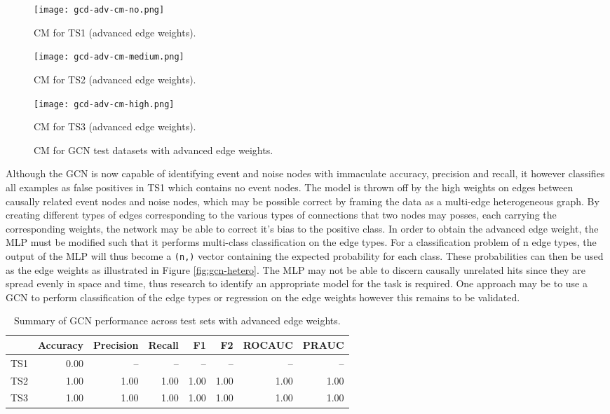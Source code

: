 \begin{figure}[htb]
  \centering
    \begin{minipage}{0.32\textwidth}
    \centering
    \texttt{[image: gcd-adv-cm-no.png]}
    \caption{CM for TS1 (advanced edge weights).}
  \end{minipage}
  \begin{minipage}{0.32\textwidth}
    \centering
    \texttt{[image: gcd-adv-cm-medium.png]}
    \caption{CM for TS2 (advanced edge weights).}
  \end{minipage}
  \begin{minipage}{0.32\textwidth}
    \centering
    \texttt{[image: gcd-adv-cm-high.png]}
    \caption{CM for TS3 (advanced edge weights).}
  \end{minipage}
  \caption{CM for GCN test datasets with advanced edge weights.}
  \label{fig:gcn-cm-adv}
\end{figure}

Although the GCN is now capable of identifying event and noise nodes
with immaculate accuracy, precision and recall, it however classifies
all examples as false positives in TS1 which contains no event nodes.
The model is thrown off by the high weights on edges between causally
related event nodes and noise nodes, which may be possible correct by
framing the data as a multi-edge heterogeneous graph. By creating
different types of edges corresponding to the various types of
connections that two nodes may posses, each carrying the corresponding
weights, the network may be able to correct it's bias to the positive
class. In order to obtain the advanced edge weight, the MLP must be
modified such that it performs multi-class classification on the edge
types. For a classification problem of n edge types, the output of the
MLP will thus become a \texttt{(n,)} vector containing the expected
probability for each class. These probabilities can then be used as
the edge weights as illustrated in Figure \ref{fig:gcn-hetero}. The
MLP may not be able to discern causally unrelated hits since they are
spread evenly in space and time, thus research to identify an
appropriate model for the task is required. One approach may be to use
a GCN to perform classification of the edge types or regression on the
edge weights \cite{gong2019exploiting} however this remains to be
validated.

\begin{table}[htb]
  \centering
  \caption{Summary of GCN performance across test sets with advanced
    edge weights.}
  \begin{tabular}{lrrrrrrr}
    \hline
    & Accuracy & Precision & Recall & F1 & F2 & ROCAUC & PRAUC \\
    \hline
    TS1 & 0.00 & -- & -- & -- & -- & -- & -- \\
    TS2 & 1.00 & 1.00 & 1.00 & 1.00 & 1.00 & 1.00 & 1.00 \\
    TS3 & 1.00 & 1.00 & 1.00 & 1.00 & 1.00 & 1.00 & 1.00 \\
    \hline
  \end{tabular}
  \label{tab:gcn-results-adv}
\end{table}

